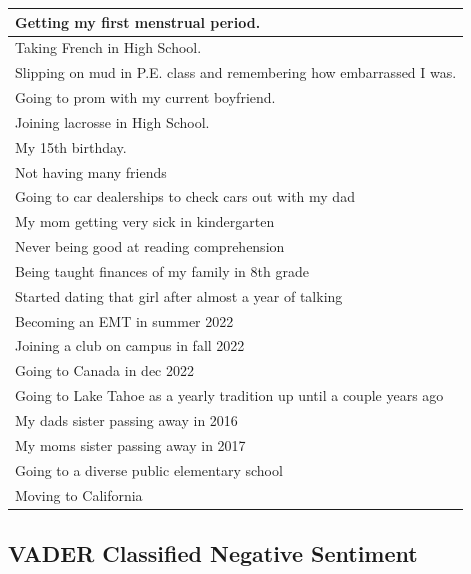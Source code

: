 \documentclass[
  .7em,
  letterpaper,
  DIV=11,
  numbers=noendperiod]{scrartcl}
\begin{document}
\begin{table}
\begin{tabular}{l}
\hline
Getting my first menstrual period.\\
\hline
Taking French in High School.\\
\hline
Slipping on mud in P.E. class and remembering how embarrassed I was.\\
\hline
Going to prom with my current boyfriend.\\
\hline
Joining lacrosse in High School.\\
\hline
My 15th birthday.\\
\hline
Not having many friends\\
\hline
Going to car dealerships to check cars out with my dad\\
\hline
My mom getting very sick in kindergarten\\
\hline
Never being good at reading comprehension\\
\hline
Being taught finances of my family in 8th grade\\
\hline
Started dating that girl after almost a year of talking\\
\hline
Becoming an EMT in summer 2022\\
\hline
Joining a club on campus in fall 2022\\
\hline
Going to Canada in dec 2022\\
\hline
Going to Lake Tahoe as a yearly tradition up until a couple years ago\\
\hline
My dads sister passing away in 2016\\
\hline
My moms sister passing away in 2017\\
\hline
Going to a diverse public elementary school\\
\hline
Moving to California\\
\hline
\end{tabular}
\end{table}

\hypertarget{vader-classified-negative-sentiment}{%
\subsection{VADER Classified Negative
Sentiment}\label{vader-classified-negative-sentiment}}
\end{document}
